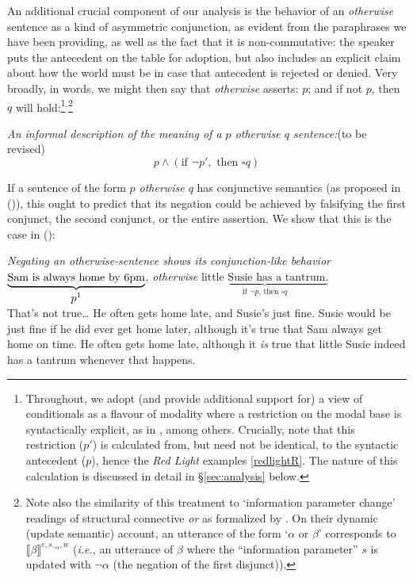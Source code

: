 An additional crucial component of our analysis is the behavior of an \textit{otherwise} sentence as a kind of asymmetric conjunction, as evident from the paraphrases we have been providing, as well as the fact that it is non-commutative: the speaker puts the antecedent on the table for adoption, but also includes an explicit claim about how the world must be in case that antecedent is rejected or denied. Very broadly, in words, we might then say that \textit{otherwise} asserts: $p$; and if not $p$, then $q$ will hold:\footnote{Throughout, we adopt (and provide additional support for) a view of conditionals as a flavour of modality where a restriction on the modal base is syntactically explicit, as in \citealt{Lewis1975, Kratzer1981, Kratzer2012, Heim}, among others. Crucially, note that this restriction ($ p' $) is calculated from, but need not be identical, to the syntactic antecedent ($ p $), hence the \textit{Red Light} examples \ref{redlightR}. The nature of this calculation is discussed in detail in \S \ref{sec:analysis} below.}$^, $\footnote{Note also the similarity of this treatment to `information parameter change' readings of structural connective \textit{or} as formalized by \citet[155-6]{Klinedinst2012}. On their dynamic (update semantic) account, an utterance of the form `$ \alpha $ or $ \beta $' corresponds to $ \llbracket\beta\rrbracket^{c,s_{\neg\alpha},w} $ (\textit{i.e.}, an utterance of $ \beta $ where the ``information parameter'' $ s $ is updated with $ \neg\alpha $ (the negation of the first disjunct)).	}%

\pex  \label{informal} \textit{An informal description of the meaning of a $ p $ \emph{otherwise} $ q $ sentence:}\hfill(to be revised)
$$p\wedge (\text{if } \neg p',\text{ then }\square q)$$\xe


If a sentence of the form \textit{$ p $ otherwise $ q $} has conjunctive semantics (as proposed in (\lastx)), this ought to predict that its negation could be achieved by falsifying the first conjunct, the second conjunct, or the entire assertion. We show that this is the case in (\nextx): 

\pex  \label{conjunction}\textit{Negating an \emph{otherwise}-sentence shows its conjunction-like behavior}
\a[label=A:]  $\underbrace{\text{Sam is always home by 6pm}}_{\textstyle p\footnotemark{}}$, \textit{otherwise} $\underbrace{\text{little Susie has a tantrum.}}_{\textstyle \text{if } \neg p \text{, then } \square q}$ \\
\a[label=B:] That's not true\ldots	
\a  He often gets home late, and Susie's just fine. 
\a  Susie would be just fine if he did ever get home later, although it's true that Sam always get home on time.
\a  He often gets home late, although it \textit{is} true that little Susie indeed has a tantrum whenever that happens.\xe

